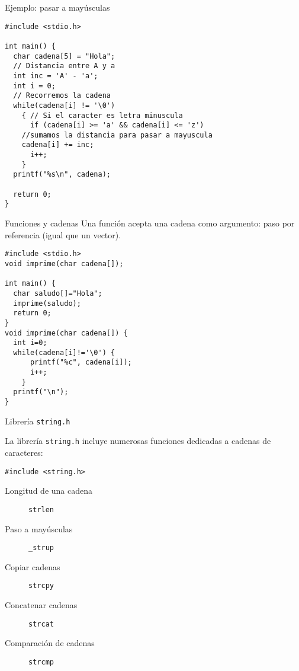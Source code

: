 \documentclass[xcolor={usenames,svgnames,dvipsnames}, aspectratio=169]{beamer}
\begin{document}
\begin{frame}[label={sec:orgfb4a17a},fragile,plain]{Ejemplo: pasar a mayúsculas}
 \lstset{language=C,label= ,caption= ,captionpos=b,numbers=none}
\begin{lstlisting}
#include <stdio.h>

int main() {
  char cadena[5] = "Hola";
  // Distancia entre A y a
  int inc = 'A' - 'a';
  int i = 0;
  // Recorremos la cadena
  while(cadena[i] != '\0')
    { // Si el caracter es letra minuscula
      if (cadena[i] >= 'a' && cadena[i] <= 'z')
	//sumamos la distancia para pasar a mayuscula
	cadena[i] += inc;
      i++;
    }
  printf("%s\n", cadena);

  return 0;
}
\end{lstlisting}
\end{frame}
\begin{frame}[label={sec:orgc4c8853},fragile]{Funciones y cadenas}
 Una función acepta una cadena como argumento: \alert{paso por referencia} (igual que un vector).

\lstset{language=C,label= ,caption= ,captionpos=b,numbers=none}
\begin{lstlisting}
#include <stdio.h>
void imprime(char cadena[]); 

int main() {
  char saludo[]="Hola";
  imprime(saludo);
  return 0;
}
void imprime(char cadena[]) {
  int i=0;
  while(cadena[i]!='\0') {
      printf("%c", cadena[i]);
      i++;
    }
  printf("\n");
}
\end{lstlisting}
\end{frame}
\begin{frame}[label={sec:org9ce2296},fragile]{Librería \texttt{string.h}}
 \begin{block}{}
La librería \texttt{string.h} incluye numerosas funciones dedicadas a cadenas de caracteres:

\lstset{language=C,label= ,caption= ,captionpos=b,numbers=none}
\begin{lstlisting}
#include <string.h>
\end{lstlisting}

\begin{description}
\item[{Longitud de una cadena}] \texttt{strlen}
\item[{Paso a mayúsculas}] \texttt{\_strup}
\item[{Copiar cadenas}] \texttt{strcpy}
\item[{Concatenar cadenas}] \texttt{strcat}
\item[{Comparación de cadenas}] \texttt{strcmp}
\end{description}
\end{block}
\end{frame}
\end{document}
